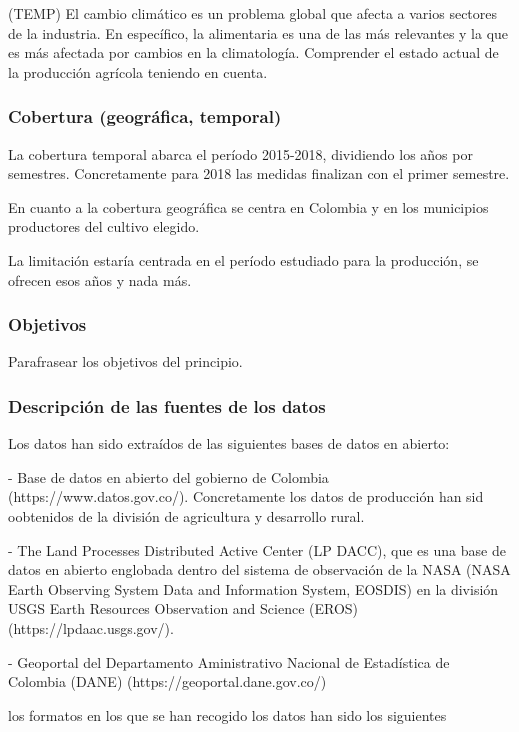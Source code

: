\documentclass[12pt, spanish]{article}
\begin{document}
(TEMP) 
El cambio climático es un problema global que afecta a varios sectores de la industria. En específico, la alimentaria es una de las más relevantes y la que es más afectada por cambios en la climatología. Comprender el estado actual de la producción agrícola teniendo en cuenta. 

\subsubsection{Cobertura (geográfica, temporal)}

La cobertura temporal abarca el período 2015-2018, dividiendo los años por   semestres. Concretamente para 2018 las medidas finalizan con el primer semestre.

En cuanto a la cobertura geográfica se centra en Colombia y en los municipios productores del cultivo elegido.

La limitación estaría centrada en el período estudiado para la producción, se ofrecen esos años y nada más.

\subsubsection{Objetivos}

Parafrasear los objetivos del principio.

\subsubsection{Descripción de las fuentes de los datos}

Los datos han sido extraídos de las siguientes bases de datos en abierto: 

- Base de datos en abierto del gobierno de Colombia (https://www.datos.gov.co/). Concretamente los datos de producción han sid oobtenidos de la división de agricultura y desarrollo rural.

- The Land Processes Distributed Active Center (LP DACC), que es una base de datos en abierto englobada dentro del sistema de observación de la NASA (NASA Earth Observing System Data and Information System, EOSDIS) en la división USGS Earth Resources Observation and Science (EROS) (https://lpdaac.usgs.gov/).

- Geoportal del Departamento Aministrativo Nacional de Estadística de Colombia (DANE) (https://geoportal.dane.gov.co/)

los formatos en los que se han recogido los datos han sido los siguientes
\end{document}
